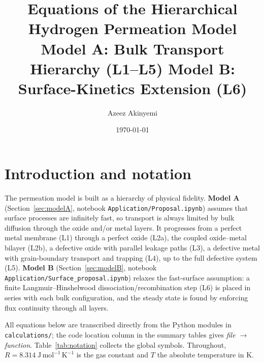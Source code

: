 \documentclass[11pt,a4paper]{article}
\title{Equations of the Hierarchical Hydrogen Permeation Model\\
\large Model A: Bulk Transport Hierarchy (L1--L5) \quad
Model B: Surface-Kinetics Extension (L6)}
\author{Azeez Akinyemi}
\date{\today}
\newcommand{\code}[1]{\texttt{#1}}
\begin{document}
\maketitle
\tableofcontents
\clearpage

\section{Introduction and notation}

The permeation model is built as a hierarchy of physical fidelity. \textbf{Model
A} (Section~\ref{sec:modelA}, notebook \code{Application/Proposal.ipynb})
assumes that surface processes are infinitely fast, so transport is always
limited by bulk diffusion through the oxide and/or metal layers. It progresses
from a perfect metal membrane (L1) through a perfect oxide (L2a), the coupled
oxide--metal bilayer (L2b), a defective oxide with parallel leakage paths (L3),
a defective metal with grain-boundary transport and trapping (L4), up to the
full defective system (L5). \textbf{Model B} (Section~\ref{sec:modelB},
notebook \code{Application/Surface\_proposal.ipynb}) relaxes the fast-surface
assumption: a finite Langmuir--Hinshelwood dissociation/recombination step (L6)
is placed in series with each bulk configuration, and the steady state is found
by enforcing flux continuity through all layers.

All equations below are transcribed directly from the Python modules in
\code{calculations/}; the code location column in the summary tables gives
\emph{file $\rightarrow$ function}. Table~\ref{tab:notation} collects the
global symbols. Throughout, $R = 8.314\;\mathrm{J\,mol^{-1}\,K^{-1}}$ is the
gas constant and $T$ the absolute temperature in K.
\end{document}
